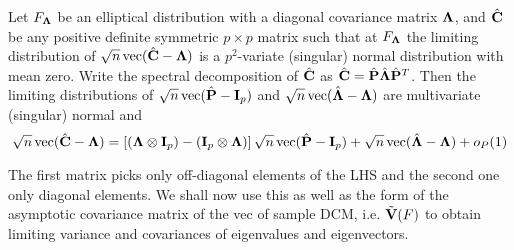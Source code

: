 \begin{Theorem} \label{Theorem:decomp} \citep{taskinen12}
Let $F_{\boldsymbol{\Lambda}}$ be an elliptical distribution with a diagonal covariance matrix ${\boldsymbol{\Lambda}}$, and $\hat {{\mathbf{C}}}$ be any positive definite symmetric $p \times p$ matrix such that at $F_{\boldsymbol{\Lambda}}$ the limiting distribution of $\sqrt n \operatorname*{vec}(\hat {{\mathbf{C}}} - {\boldsymbol{\Lambda}})$ is a $p^2$-variate (singular) normal distribution with mean zero. Write the spectral decomposition of $\hat {{\mathbf{C}}}$ as $\hat {{\mathbf{C}}} = \hat {{\mathbf{P}}} \hat{{\boldsymbol{\Lambda}}} \hat {{\mathbf{P}}}^T$. Then the limiting distributions of $\sqrt n \operatorname*{vec}(\hat {{\mathbf{P}}} - {\mathbf{I}}_p)$ and $\sqrt n \operatorname*{vec}( \hat{{\boldsymbol{\Lambda}}} - {\boldsymbol{\Lambda}})$ are multivariate (singular) normal and
%
\begin{equation} \label{equation:decompEq}
\sqrt n \operatorname*{vec} (\hat {{\mathbf{C}}} - {\boldsymbol{\Lambda}})  = \left[ ({\boldsymbol{\Lambda}} \otimes {\mathbf{I}}_p) - ({\mathbf{I}}_p \otimes {\boldsymbol{\Lambda}}) \right] \sqrt n \operatorname*{vec} (\hat {{\mathbf{P}}} - {\mathbf{I}}_p) + \sqrt n \operatorname*{vec} (\hat {{\boldsymbol{\Lambda}}} - {\boldsymbol{\Lambda}}) + o_P(1)
\end{equation}
\end{Theorem}

The first matrix picks only off-diagonal elements of the LHS and the second one only diagonal elements. We shall now use this as well as the form of the asymptotic covariance matrix of the vec of sample DCM, i.e. $\tilde{{\mathbf{V}}} (F)$ to obtain limiting variance and covariances of eigenvalues and eigenvectors.

